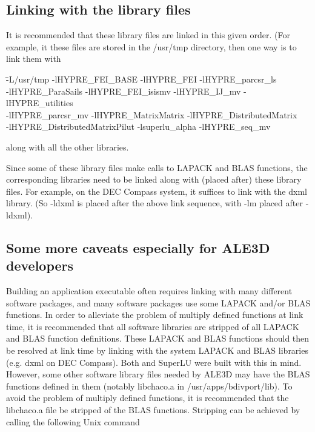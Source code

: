 \subsection{Linking with the library files}

It is recommended that these library files are linked in this given order.
(For example, it these files are stored in the /usr/tmp directory, then
one way is to link them with

\begin{tabbing}
\hspace{0.5in} \= -L/usr/tmp -lHYPRE\_FEI\_BASE -lHYPRE\_FEI -lHYPRE\_parcsr\_ls \\
\> -lHYPRE\_ParaSails -lHYPRE\_FEI\_isismv -lHYPRE\_IJ\_mv -lHYPRE\_utilities \\
\> -lHYPRE\_parcsr\_mv -lHYPRE\_MatrixMatrix -lHYPRE\_DistributedMatrix \\
\> -lHYPRE\_DistributedMatrixPilut -lsuperlu\_alpha -lHYPRE\_seq\_mv
\end{tabbing}

along with all the other libraries.  

Since some of these library files make calls to LAPACK and BLAS functions, 
the corresponding libraries need to be linked along with (placed after) these 
library files.  For example, on the DEC Compass system, it suffices to link
with the {\sf dxml} library. (So {\sf -ldxml} is placed after the above link
sequence, with {\sf -lm} placed after {\sf -ldxml}).

\subsection{Some more caveats especially for ALE3D developers}

Building an application executable often requires linking with many different
software packages, and many software packages use some LAPACK and/or BLAS
functions.  In order to alleviate the problem of multiply defined functions
at link time, it is recommended that all software libraries are stripped of
all LAPACK and BLAS function definitions.  These LAPACK and BLAS functions 
should then be resolved at link time by linking with the system LAPACK and
BLAS libraries (e.g. dxml on DEC Compass).  Both \hypre{} and SuperLU were
built with this in mind.  However, some other software library files needed
by ALE3D may have the BLAS functions defined in them (notably libchaco.a
in /usr/apps/bdivport/lib).  To avoid the problem of multiply defined functions,
it is recommended that the libchaco.a file be stripped of the BLAS functions.
Stripping can be achieved by calling the following Unix command

